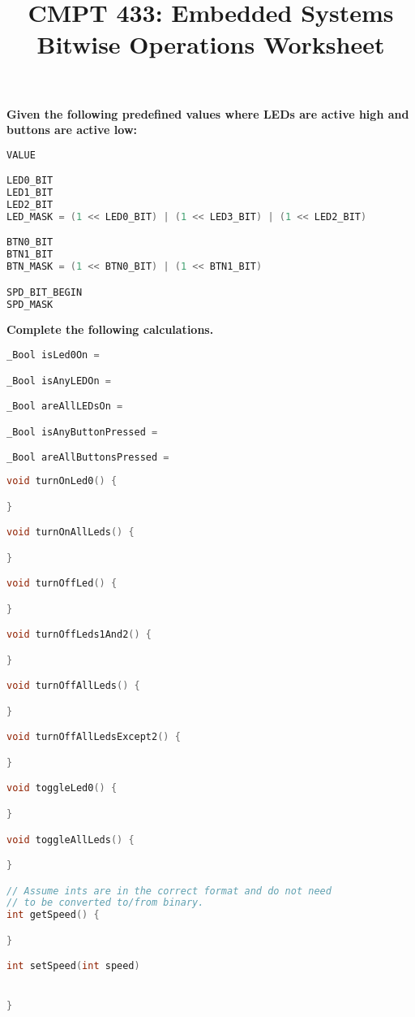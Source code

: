 \documentclass[11pt, oneside, letterpaper]{article}
\title{CMPT 433: Embedded Systems \\\medskip \Large Bitwise Operations Worksheet}
\author{}
\date{}
\begin{document}
	\maketitle
	
	\textbf{Given the following predefined values where LEDs are active high and buttons are active low:}

\begin{lstlisting}[language=C, columns=fixed]
VALUE

LED0_BIT
LED1_BIT
LED2_BIT
LED_MASK = (1 << LED0_BIT) | (1 << LED3_BIT) | (1 << LED2_BIT) 

BTN0_BIT
BTN1_BIT
BTN_MASK = (1 << BTN0_BIT) | (1 << BTN1_BIT)

SPD_BIT_BEGIN
SPD_MASK
\end{lstlisting}

\vspace{1cm}

\textbf{Complete the following calculations.}

\begin{lstlisting}[language=C, columns=fixed]
_Bool isLed0On =

_Bool isAnyLEDOn =

_Bool areAllLEDsOn =

_Bool isAnyButtonPressed =

_Bool areAllButtonsPressed =
\end{lstlisting}

\clearpage

\begin{lstlisting}[language=C, columns=fixed]
void turnOnLed0() {

}

void turnOnAllLeds() {

}

void turnOffLed() {

}

void turnOffLeds1And2() {

}

void turnOffAllLeds() {

}

void turnOffAllLedsExcept2() {

}

void toggleLed0() {

}

void toggleAllLeds() {

}

// Assume ints are in the correct format and do not need 
// to be converted to/from binary.
int getSpeed() {

}

int setSpeed(int speed)


}
\end{lstlisting}
\end{document}
